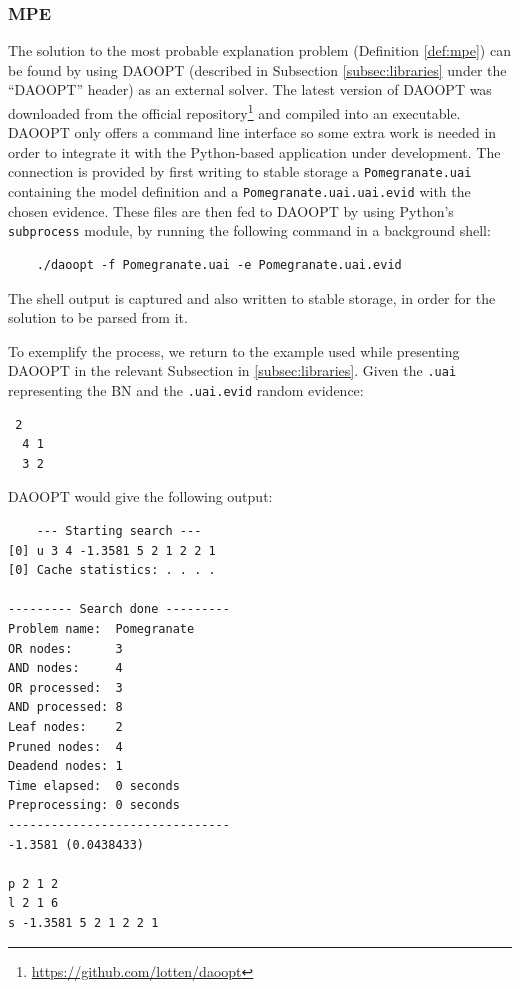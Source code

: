 \subsubsection{MPE}
The solution to the most probable explanation problem (Definition \ref{def:mpe}) can be found by using DAOOPT (described in Subsection \ref{subsec:libraries} under the \enquote{DAOOPT} header) as an external solver.
The latest version of DAOOPT was downloaded from the official repository\footnote{\url{https://github.com/lotten/daoopt}} and compiled into an executable.
DAOOPT only offers a command line interface so some extra work is needed in order to integrate it with the Python-based application under development.
The connection is provided by first writing to stable storage a \texttt{Pomegranate.uai} containing the model definition and a \texttt{Pomegranate.uai.uai.evid} with the chosen evidence.
These files are then fed to DAOOPT by using Python's \texttt{subprocess} module, by running the following command in a background shell:
\begin{verbatim}
	./daoopt -f Pomegranate.uai -e Pomegranate.uai.evid
\end{verbatim}
The shell output is captured and also written to stable storage, in order for the solution to be parsed from it.

To exemplify the process, we return to the example used while presenting DAOOPT in the relevant Subsection in \ref{subsec:libraries}.
Given the \texttt{.uai} representing the BN and the \texttt{.uai.evid} random evidence:
\begin{mdframed}
\begin{verbatim}
 2
  4 1
  3 2
\end{verbatim}
\end{mdframed}

DAOOPT would give the following output:
\begin{mdframed}
\begin{verbatim}
	--- Starting search ---
[0] u 3 4 -1.3581 5 2 1 2 2 1
[0] Cache statistics: . . . .

--------- Search done ---------
Problem name:  Pomegranate
OR nodes:      3
AND nodes:     4
OR processed:  3
AND processed: 8
Leaf nodes:    2
Pruned nodes:  4
Deadend nodes: 1
Time elapsed:  0 seconds
Preprocessing: 0 seconds
-------------------------------
-1.3581 (0.0438433)

p 2 1 2
l 2 1 6
s -1.3581 5 2 1 2 2 1
\end{verbatim}	
\end{mdframed}

